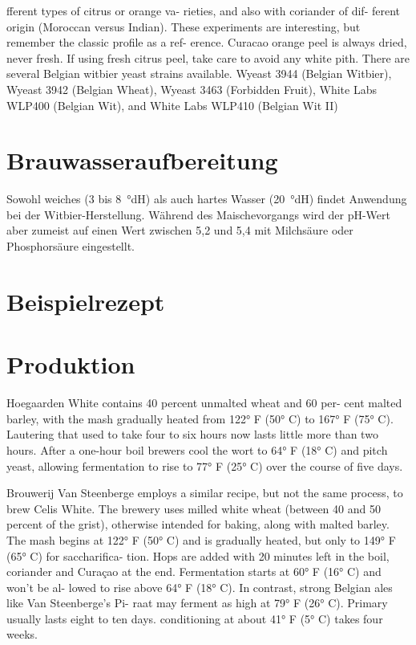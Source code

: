 \documentclass[a4paper,parskip=half]{scrartcl}
\begin{document}
\parencite[27]{Strong2021}
fferent types of citrus or orange va-
rieties, and also with coriander of dif-
ferent origin (Moroccan versus Indian).
These experiments are interesting, but
remember the classic profile as a ref-
erence. Curacao orange peel is always
dried, never fresh. If using fresh citrus
peel, take care to avoid any white pith.
There are several Belgian witbier
yeast strains available. Wyeast 3944
(Belgian Witbier), Wyeast 3942 (Belgian
Wheat), Wyeast 3463 (Forbidden Fruit),
White Labs WLP400 (Belgian Wit), and
White Labs WLP410 (Belgian Wit II)

\section*{Brauwasseraufbereitung}

Sowohl weiches (3 bis 8~°dH) als auch hartes Wasser (20~°dH) findet
Anwendung bei der Witbier-Herstellung. Während des Maischevorgangs
wird der pH-Wert aber zumeist auf einen Wert zwischen 5,2 und
5,4 mit Milchsäure oder Phosphorsäure eingestellt. \parencite[14]{Strottner1999}

\section*{Beispielrezept}

\section*{Produktion}

\parencite[52]{Hieronymus2010}
Hoegaarden White contains 40 percent unmalted wheat and 60 per-
cent malted barley, with the mash gradually heated from 122° F (50° C)
to 167° F (75° C). Lautering that used to take four to six hours now lasts
little more than two hours. After a one-hour boil brewers cool the wort
to 64° F (18° C) and pitch yeast, allowing fermentation to rise to 77°
F (25° C) over the course of five days.

\parencite[52-53]{Hieronymus2010}
Brouwerij Van Steenberge employs a similar recipe, but not the
same process, to brew Celis White. The brewery uses milled white
wheat (between 40 and 50 percent of the grist), otherwise intended for
baking, along with malted barley. The mash begins at 122° F (50° C)
and is gradually heated, but only to 149° F (65° C) for saccharifica-
tion. Hops are added with 20 minutes left in the boil, coriander and
Curaçao at the end. Fermentation starts at
60° F (16° C) and won’t be al-
lowed to rise above 64° F (18°
C). In contrast, strong Belgian
ales like Van Steenberge’s Pi-
raat may ferment as high at 79°
F (26° C). Primary usually lasts
eight to ten days. conditioning at about 41° F (5° C) takes four weeks.
\end{document}
